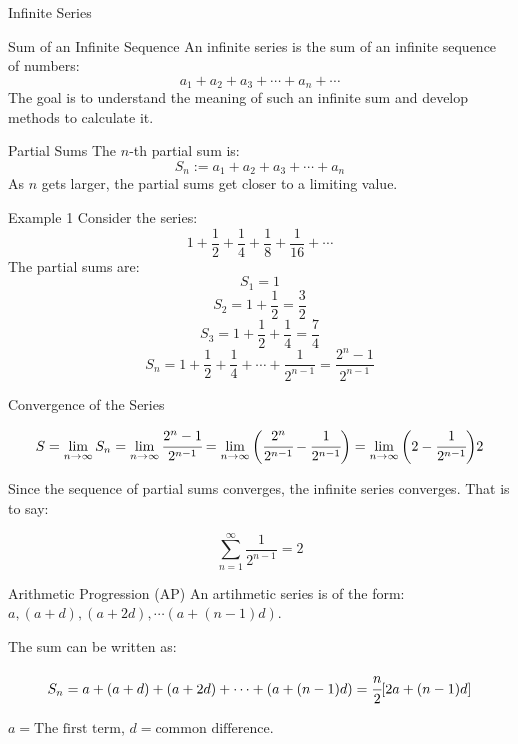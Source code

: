 \documentclass[aspectratio=169,xcolor=dvipsnames,svgnames,x11names,fleqn]{beamer}
\begin{document}
\begin{frame}{}
    \begin{center}
    \Huge \bf \color{DarkBlue}
    \faFire
    
    Infinite Series
\end{center}
\end{frame}


\begin{frame}{Sum of an Infinite Sequence}
An infinite series is the sum of an infinite sequence of numbers:
$$a_1 + a_2 + a_3 + \cdots + a_n + \cdots$$
The goal is to understand the meaning of such an infinite sum and develop methods to calculate it.
\end{frame}

\begin{frame}{Partial Sums}
The $n$-th partial sum is:
$$S_n := a_1 + a_2 + a_3 + \cdots + a_n$$
As $n$ gets larger, the partial sums get closer to a limiting value.
\end{frame}

\begin{frame}{Example 1}
Consider the series:
$$1 + \frac{1}{2} + \frac{1}{4} + \frac{1}{8} + \frac{1}{16} + \cdots$$
The partial sums are:
$$S_1 = 1$$
$$S_2 = 1 + \frac{1}{2} = \frac{3}{2}$$
$$S_3 = 1 + \frac{1}{2} + \frac{1}{4} = \frac{7}{4}$$
$$S_n = 1 + \frac{1}{2} + \frac{1}{4} + \cdots + \frac{1}{2^{n-1}} =  \frac{2^n - 1}{2^{n-1}}$$
\end{frame}

\begin{frame}{Convergence of the Series}

$$
S = \lim_{n \to \infty} S_n = \lim_{n\to \infty} \cfrac{2^n - 1}{2^{n-1}} =   \lim_{n \to \infty} \bigg (  \cfrac{2^n}{2^{n-1}} - \cfrac{1}{2^{n-1}}\bigg) =  \lim_{n \to \infty} \bigg( 2 - \cfrac{1}{2^{n-1}}\bigg) 2
$$

Since the sequence of partial sums converges, the infinite series converges. That is to say:

$$\sum_{n=1}^{\infty} \frac{1}{2^{n-1}} = 2$$
\end{frame}

\begin{frame}{Arithmetic Progression (AP)}
An artihmetic series is of the form: $a, (a+d), (a+2d), \cdots (a+(n-1)d)$.

The sum can be written as:

$$
S_n = a + (a+d)  + (a+2d) + \cdots +(a + (n-1)d) = \cfrac{n}{2}[2a + (n-1)d]
$$

$
a = \text{The first term}
$, $ d = \text{common difference}$.
\end{frame}
\end{document}
